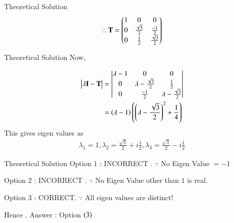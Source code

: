 \documentclass{beamer}
\begin{document}
\begin{frame}{Theoretical Solution}
\begin{align}
    \therefore \mathbf{T} = \begin{pmatrix}1&0&0\\0&\frac{\sqrt{3}}{2}&\frac{-1}{2}\\ 0&\frac{1}{2}&\frac{\sqrt{3}}{2}\end{pmatrix}
\end{align}
\end{frame}

\begin{frame}{Theoretical Solution}
Now, 

\begin{align}
    \begin{vmatrix}\lambda\mathbf{I}-\mathbf{T}\end{vmatrix} &= \begin{vmatrix}\lambda-1 & 0 & 0 \\ 0 & \lambda-\frac{\sqrt{3}}{2}& \frac{1}{2} \\ 0 & \frac{-1}{2} & \lambda-\frac{\sqrt{3}}{2}\end{vmatrix}\\
    &= \left(\lambda-1\right)\left(\left(\lambda-\frac{\sqrt{3}}{2}\right)^2 + \frac{1}{4}\right)
\end{align}
This gives eigen values as
\begin{align}
    \lambda_1 = 1 , \lambda_2 = \frac{\sqrt{3}}{2} + i\frac{1}{2} , \lambda_3 =\frac{\sqrt{3}}{2} - i\frac{1}{2}
\end{align}
\end{frame}

\begin{frame}{Theoretical Solution}
Option $1$ : INCORRECT . $\because$ No Eigen Value $= -1$

Option $2$ : INCORRECT . $\because$ No Eigen Value other than $1$ is real. 

Option $3$ : CORRECT.    $\because$ All eigen values are distinct! 

Hence , Answer : Option $\left(3\right)$
\end{frame}
\end{document}

